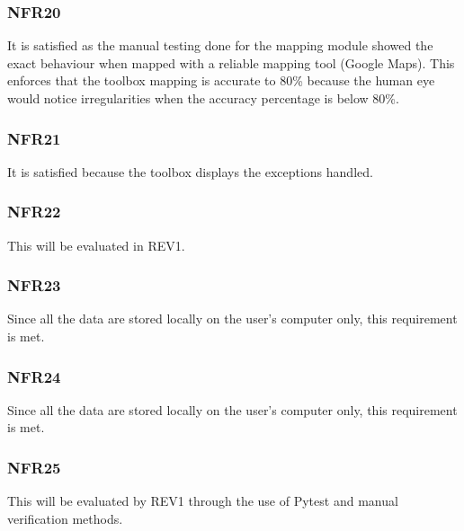 \documentclass[12pt, titlepage]{article}
\begin{document}
\subsubsection{NFR20} 
It is satisfied as the manual testing done for the mapping module showed the exact behaviour when mapped with a reliable mapping tool (Google Maps). This enforces that the toolbox mapping is accurate to 80\% because the human eye would notice irregularities when the accuracy percentage is below 80\%. 
\subsubsection{NFR21} It is satisfied because the toolbox displays the exceptions handled.
\subsubsection{NFR22} 
This will be evaluated in REV1.
\subsubsection{NFR23}
Since all the data are stored locally on the user's computer only, this requirement is met.
\subsubsection{NFR24}
Since all the data are stored locally on the user's computer only, this requirement is met.
\subsubsection{NFR25}
This will be evaluated by REV1 through the use of Pytest and manual verification methods. 
\end{document}
